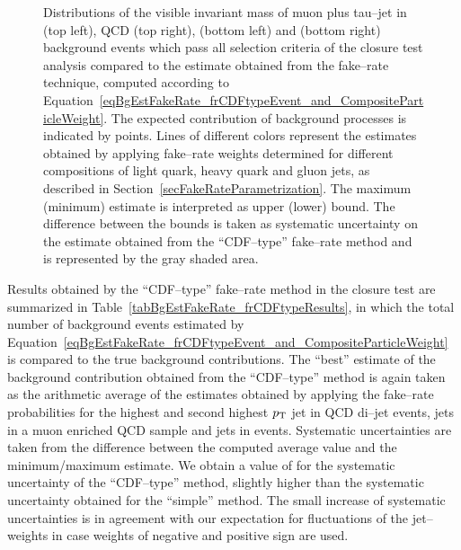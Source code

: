 \begin{figure}[t]
\begin{center}
\begin{picture}
\end{picture}
\caption[Visible mass in the Fake--rate method]{\captiontext Distributions of
the visible invariant mass of muon plus tau--jet in \WpJets (top left), QCD (top
right), \ttbarpJets (bottom left) and \ZMM (bottom right) background events
which pass all selection criteria of the closure test analysis compared to the
estimate obtained from the fake--rate technique, computed according to
Equation~\ref{eqBgEstFakeRate_frCDFtypeEvent_and_CompositeParticleWeight}.  The
expected contribution of background processes is indicated by points.  Lines of
different colors represent the estimates obtained by applying fake--rate weights
determined for different compositions of light quark, heavy quark and gluon
jets, as described in Section~\ref{secFakeRateParametrization}.  The maximum
(minimum) estimate is interpreted as upper (lower) bound.  The difference
between the bounds is taken as systematic uncertainty on the estimate obtained
from the ``CDF--type'' fake--rate method and is represented by the gray shaded
area.} \label{figBgEstFakeRate_frCDFtypeResults_mVisible}
\end{center}
\end{figure} 

Results obtained by the ``CDF--type'' fake--rate method in the closure test are
summarized in Table~\ref{tabBgEstFakeRate_frCDFtypeResults}, in which the total
number of background events estimated by
Equation~\ref{eqBgEstFakeRate_frCDFtypeEvent_and_CompositeParticleWeight} is
compared to the true background contributions.  The ``best'' estimate of the
background contribution obtained from the ``CDF--type'' method is again taken as
the arithmetic average of the estimates obtained by applying the fake--rate
probabilities for the highest and second highest $\pt$ jet in QCD di--jet
events, jets in a muon enriched QCD sample and jets in \WpJets events.
Systematic uncertainties are taken from the difference between the computed
average value and the minimum/maximum estimate.  We obtain a value of 
 for the systematic uncertainty of the ``CDF--type'' method,
slightly higher than the systematic uncertainty obtained for the ``simple''
method.  The small increase of systematic uncertainties is in agreement with our
expectation for fluctuations of the jet--weights in case weights of negative and
positive sign are used.

